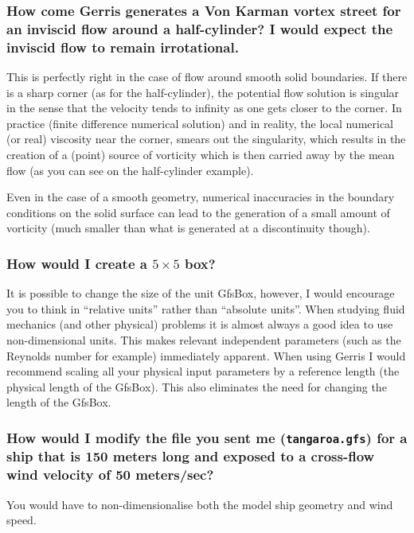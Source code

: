 \documentclass[a4paper]{article}
\begin{document}
\subsubsection{How come Gerris generates a Von Karman vortex street for 
an inviscid flow around a half-cylinder? I would expect the inviscid flow 
to remain irrotational.}

This is perfectly right in the case of flow around smooth
solid boundaries. If there is a sharp corner (as for the
half-cylinder), the potential flow solution is singular in the sense
that the velocity tends to infinity as one gets closer to the
corner. In practice (finite difference numerical solution) and in
reality, the local numerical (or real) viscosity near the corner,
smears out the singularity, which results in the creation of a (point) 
source of vorticity which is then carried away by the mean flow (as
you can see on the half-cylinder example).

Even in the case of a smooth geometry, numerical inaccuracies in the
boundary conditions on the solid surface can lead to the generation of 
a small amount of vorticity (much smaller than what is generated at a
discontinuity though).

\subsubsection{How would I create a $5\times 5$ box?}

It is possible to change the size of the unit GfsBox, however, I would
encourage you to think in ``relative units'' rather than ``absolute
units''. When studying fluid mechanics (and other physical) problems it
is almost always a good idea to use non-dimensional units. This makes
relevant independent parameters (such as the Reynolds number for
example) immediately apparent. When using Gerris I would recommend
scaling all your physical input parameters by a reference length (the
physical length of the GfsBox). This also eliminates the need for
changing the length of the GfsBox.

\subsubsection{How would I modify the file you sent me ({\tt tangaroa.gfs}) for a ship that is 150 
meters long and exposed to a cross-flow wind velocity of 50 meters/sec?}
 
You would have to non-dimensionalise both the model ship geometry and wind speed.
\end{document}

